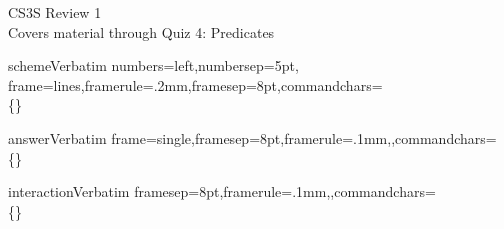 \documentclass[pdftex,11pt]{article}
\begin{document}
\begin{center}
  \Huge{CS3S Review 1}\\
  \large Covers material through Quiz 4: Predicates
\end{center}

\DefineVerbatimEnvironment%
  {scheme}{Verbatim}
  {numbers=left,numbersep=5pt,
   frame=lines,framerule=.2mm,framesep=8pt,commandchars=\\\{\}}

\DefineVerbatimEnvironment%
  {answer}{Verbatim}
  {frame=single,framesep=8pt,framerule=.1mm,,commandchars=\\\{\}}

\DefineVerbatimEnvironment%
  {interaction}{Verbatim}
  {framesep=8pt,framerule=.1mm,,commandchars=\\\{\}}
\end{document}

